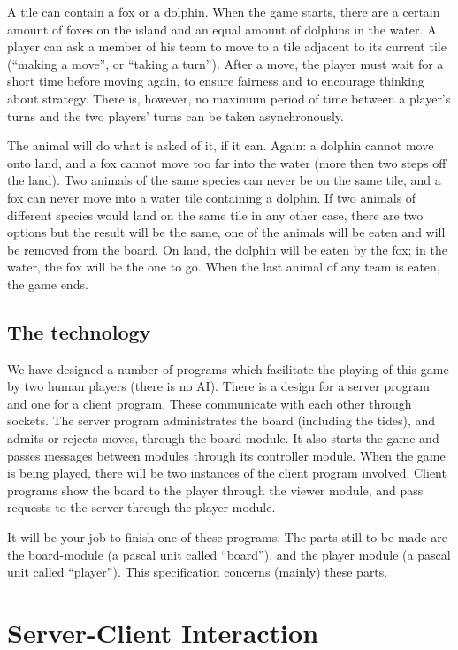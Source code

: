 \documentclass[a4paper,twoside,11pt]{book}
\begin{document}
A tile can contain a fox or a dolphin. When the game starts, there are a certain amount of foxes on the island and an equal amount of dolphins in the water. A player can ask a member of his team to move to a tile adjacent to its current tile (``making a move'', or ``taking a turn''). After a move, the player must wait for a short time before moving again, to ensure fairness and to encourage thinking about strategy. There is, however, no maximum period of time between a player's turns and the two players' turns can be taken asynchronously.

The animal will do what is asked of it, if it can. Again: a dolphin cannot move onto land, and a fox cannot move too far into the water (more then two steps off the land). Two animals of the same species can never be on the same tile, and a fox can never move into a water tile containing a dolphin. If two animals of different species would land on the same tile in any other case, there are two options but the result will be the same, one of the animals will be eaten and will be removed from the board. On land, the dolphin will be eaten by the fox; in the water, the fox will be the one to go. When the last animal of any team is eaten, the game ends.

\section{The technology}
\noindent We have designed a number of programs which facilitate the playing of this game by two human players (there is no AI). There is a design for a server program and one for a client program. These communicate with each other through sockets. The server program administrates the board (including the tides), and admits or rejects moves, through the board module. It also starts the game and passes messages between modules through its controller module. When the game is being played, there will be two instances of the client program involved. Client programs show the board to the player through the viewer module, and pass requests to the server through the player-module.

It will be your job to finish one of these programs. The parts still to be made are the board-module (a pascal unit called ``board''), and the player module (a pascal unit called ``player''). This specification concerns (mainly) these parts.

\chapter{Server-Client Interaction}
\end{document}

